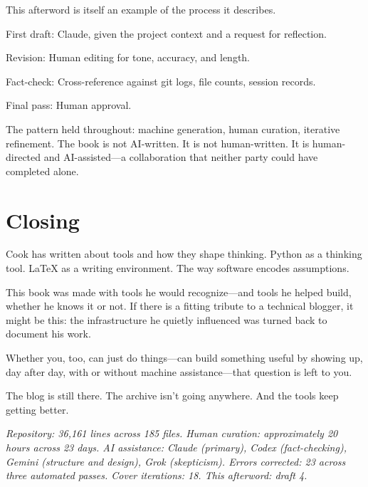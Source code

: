 This afterword is itself an example of the process it describes.

First draft: Claude, given the project context and a request for reflection.

Revision: Human editing for tone, accuracy, and length.

Fact-check: Cross-reference against git logs, file counts, session records.

Final pass: Human approval.

The pattern held throughout: machine generation, human curation, iterative refinement. The book is not AI-written. It is not human-written. It is human-directed and AI-assisted—a collaboration that neither party could have completed alone.

\bigskip

\section*{Closing}

Cook has written about tools and how they shape thinking. Python as a thinking tool. LaTeX as a writing environment. The way software encodes assumptions.

This book was made with tools he would recognize—and tools he helped build, whether he knows it or not. If there is a fitting tribute to a technical blogger, it might be this: the infrastructure he quietly influenced was turned back to document his work.

Whether you, too, can just do things—can build something useful by showing up, day after day, with or without machine assistance—that question is left to you.

The blog is still there. The archive isn't going anywhere. And the tools keep getting better.

\bigskip

\textit{Repository: 36,161 lines across 185 files. Human curation: approximately 20 hours across 23 days. AI assistance: Claude (primary), Codex (fact-checking), Gemini (structure and design), Grok (skepticism). Errors corrected: 23 across three automated passes. Cover iterations: 18. This afterword: draft 4.}
